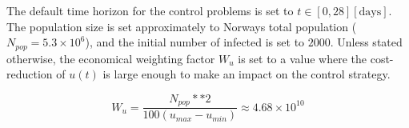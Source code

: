 The default time horizon for the control problems is set to $t \in [0, 28] [\text{days}]$. The population size is set approximately to Norways total population ($N_{pop} = 5.3\times 10^6$), and the initial number of infected is set to $2000$. Unless stated otherwise, the economical weighting factor $W_u$ is set to a value where the cost-reduction of $u(t)$ is large enough to make an impact on the control strategy.

\begin{equation}
    W_u = \frac{N_{pop}**2}{100(u_{max}-u_{min})} \approx 4.68\times 10^{10}
\end{equation}

